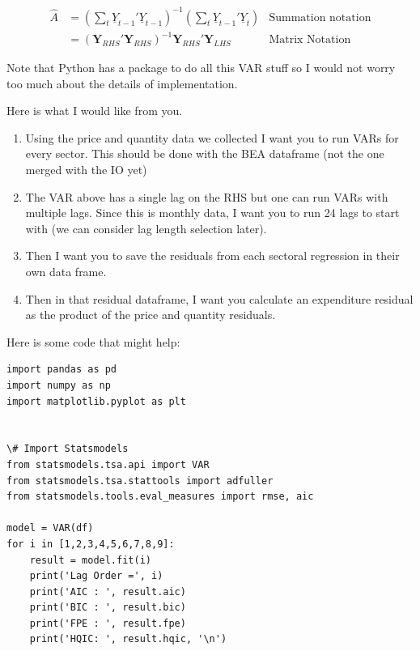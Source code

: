 \documentclass[12pt,english]{article}
\begin{document}
\begin{align*}
	\hat{A}&=\left(\sum_t \underline{Y}_{t-1}'\underline{Y}_{t-1}\right)^{-1}\left(\sum_t\underline{Y}_{t-1}'\underline{Y}_t\right)&\text{Summation notation}\\
	&=\left(\mathbf{Y}_{RHS}'\mathbf{Y}_{RHS}\right)^{-1}\mathbf{Y}_{RHS}'\mathbf{Y}_{LHS}&\text{Matrix Notation}
\end{align*}

Note that Python has a package to do all this VAR stuff so I would not worry too much about the details of implementation.

Here is what I would like from you. 

\begin{enumerate}
	\item Using the price and quantity data we collected I want you to run VARs for every sector. This should be done with the BEA dataframe (not the one merged with the IO yet)
	\item The VAR above has a single lag on the RHS but one can run VARs with multiple lags. Since this is monthly data, I want you to run 24 lags to start with (we can consider lag length selection later).
	\item Then I want you to save the residuals from each sectoral regression in their own data frame.
	\item Then in that residual dataframe, I want you calculate an expenditure residual as the product of the price and quantity residuals.
\end{enumerate}

Here is some code that might help:
	
\begin{lstlisting}[label=some-code,caption=Some Code]
import pandas as pd
import numpy as np
import matplotlib.pyplot as plt


\# Import Statsmodels
from statsmodels.tsa.api import VAR
from statsmodels.tsa.stattools import adfuller
from statsmodels.tools.eval_measures import rmse, aic

model = VAR(df)
for i in [1,2,3,4,5,6,7,8,9]:
    result = model.fit(i)
    print('Lag Order =', i)
    print('AIC : ', result.aic)
    print('BIC : ', result.bic)
    print('FPE : ', result.fpe)
    print('HQIC: ', result.hqic, '\n')
\end{lstlisting}
\end{document}
